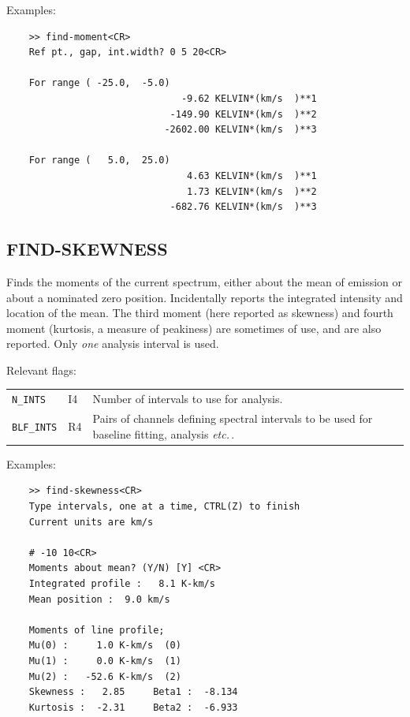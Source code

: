 \documentclass[11pt,twoside]{report}
\newcommand{\etc}{{\it etc.\,}}
\begin{document}
Examples:
\begin{verbatim}
    >> find-moment<CR>
    Ref pt., gap, int.width? 0 5 20<CR>

    For range ( -25.0,  -5.0)
                               -9.62 KELVIN*(km/s  )**1
                             -149.90 KELVIN*(km/s  )**2
                            -2602.00 KELVIN*(km/s  )**3

    For range (   5.0,  25.0)
                                4.63 KELVIN*(km/s  )**1
                                1.73 KELVIN*(km/s  )**2
                             -682.76 KELVIN*(km/s  )**3
\end{verbatim}

\subsection{FIND-SKEWNESS} 

Finds the moments of the current spectrum, either about the mean
of emission or about a nominated zero position. Incidentally reports
the integrated intensity and location of the mean. The third moment
(here reported as skewness) and fourth moment (kurtosis, a measure of
peakiness) are sometimes of use, and are also reported. Only {\em one}
analysis interval is used.

Relevant flags:\\
\begin{tabular}{lll}
  \verb+N_INTS+    & I4 & Number of intervals to use for analysis.\\
  \verb+BLF_INTS+  & R4 & \parbox[t]{4in}
                          {Pairs of channels defining spectral intervals to
                           be used for baseline fitting, analysis \etc.}
\end{tabular}

Examples:
\begin{verbatim}
    >> find-skewness<CR>
    Type intervals, one at a time, CTRL(Z) to finish
    Current units are km/s

    # -10 10<CR>
    Moments about mean? (Y/N) [Y] <CR>
    Integrated profile :   8.1 K-km/s
    Mean position :  9.0 km/s

    Moments of line profile;
    Mu(0) :     1.0 K-km/s  (0)
    Mu(1) :     0.0 K-km/s  (1)
    Mu(2) :   -52.6 K-km/s  (2)
    Skewness :   2.85     Beta1 :  -8.134
    Kurtosis :  -2.31     Beta2 :  -6.933
\end{verbatim}
\end{document}
